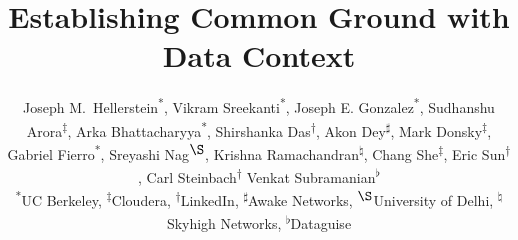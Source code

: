 \documentclass{sig-alternate}
\begin{document}
\newcommand{\smallitem}[1]{\vspace{0.5em}\noindent\textbf{#1}}
\newcommand{\smallitembot}{\vspace{0.5em}\noindent}


\newcommand{\jmh}[1]{}
\newcommand{\joey}[1]{}
\newcommand{\msd}[1]{}
\newcommand{\akon}[1]{}
\newcommand{\vikram}[1]{}

\newcommand{\core}{version graph\xspace}
\newcommand{\mantle}{model graph\xspace}
\newcommand{\crust}{lineage graph\xspace}
\newcommand{\Core}{Version Graph\xspace}
\newcommand{\Mantle}{Model Graph\xspace}
\newcommand{\Crust}{Lineage Graph\xspace}

\newcommand{\version}{\kw{Version}\xspace}
\newcommand{\richversion}{\kw{RichVersion}\xspace}
\newcommand{\thing}{\kw{Item}\xspace}
\newcommand{\GroundItem}{\kw{Item}\xspace}
\newcommand{\node}{\kw{Node}\xspace}
\newcommand{\edge}{\kw{Edge}\xspace}
\newcommand{\structure}{\kw{Structure}\xspace}
\newcommand{\graph}{\kw{Graph}\xspace}
\newcommand{\TVID}{\kw{TVID}\xspace}
\newcommand{\gtag}{\kw{Tag}\xspace}
\newcommand{\uri}{\kw{URI}\xspace}

\newcommand{\versiongraph}{versiongraph\xspace}
\newcommand{\modelgraph}{modelgraph\xspace}
\newcommand{\lineagegraph}{lineagegraph\xspace}
\newcommand{\versiongraphs}{versiongraphs\xspace}
\newcommand{\modelgraphs}{modelgraphs\xspace}
\newcommand{\lineagegraphs}{lineagegraphs\xspace}
\newcommand{\groundwire}{GroundWire\xspace}

\newcommand{\kw}[1]{{\small\texttt{#1}}}
\newcommand{\lilemail}[1]{\email{\small #1}}



\title{Establishing Common Ground with Data Context}

\author{
\alignauthor
Joseph M.\ Hellerstein\textsuperscript{*}, 
Vikram Sreekanti\textsuperscript{*}, 
Joseph E. Gonzalez\textsuperscript{*},
Sudhanshu Arora\textsuperscript{$\ddagger$},
Arka Bhattacharyya\textsuperscript{*},
Shirshanka Das\textsuperscript{$\dagger$}, 
Akon Dey\textsuperscript{$\sharp$}, 
Mark Donsky\textsuperscript{$\ddagger$}, 
Gabriel Fierro\textsuperscript{*},
Sreyashi Nag\textsuperscript{$\S$}, 
Krishna Ramachandran\textsuperscript{$\natural$}, 
Chang She\textsuperscript{$\ddagger$},
Eric Sun\textsuperscript{$\dagger$}, 
Carl Steinbach\textsuperscript{$\dagger$}
Venkat Subramanian\textsuperscript{$\flat$}\\
{\small
\textsuperscript{*}UC Berkeley, 
\textsuperscript{$\ddagger$}Cloudera,
\textsuperscript{$\dagger$}LinkedIn,
\textsuperscript{$\sharp$}Awake Networks,
\textsuperscript{$\S$}University of Delhi,
\textsuperscript{$\natural$}Skyhigh Networks,
\textsuperscript{$\flat$}Dataguise
}
}
\end{document}
